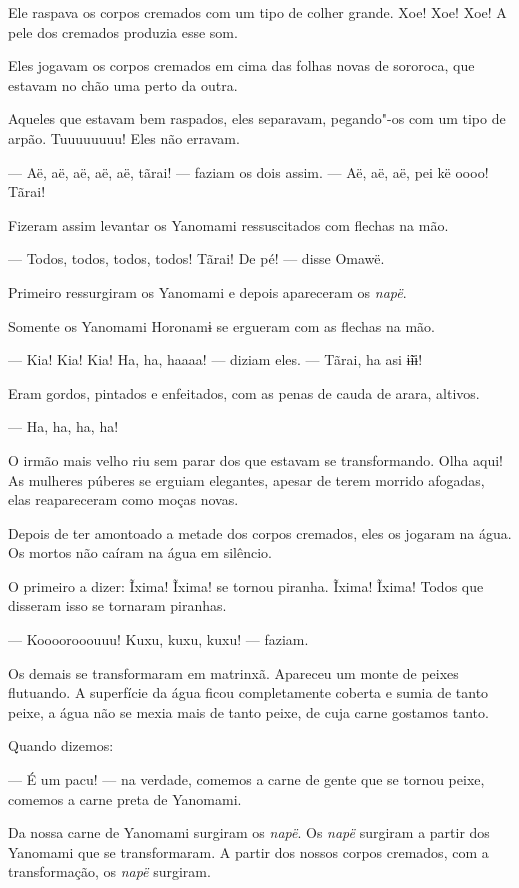 Ele raspava os corpos cremados com um tipo de colher grande. Xoe! Xoe!
Xoe! A pele dos cremados produzia esse som. 

Eles jogavam os corpos cremados em cima das folhas novas de sororoca,
que estavam no chão uma perto da outra. 

Aqueles que estavam bem raspados, eles separavam, pegando"-os com um
tipo de arpão. Tuuuuuuuu! Eles não erravam. 

--- Aë, aë, aë, aë, aë, tãrai! --- faziam os dois assim. --- Aë, aë, aë,
pei kë oooo! Tãrai! 

Fizeram assim levantar os Yanomami ressuscitados com flechas na mão. 

--- Todos, todos, todos, todos! Tãrai! De pé! --- disse Omawë.

Primeiro ressurgiram os Yanomami e depois apareceram os \emph{napë}. 

Somente os Yanomami Horonamɨ se ergueram com as flechas na mão. 

--- Kia! Kia! Kia! Ha, ha, haaaa! --- diziam eles. --- Tãrai, ha asi
ɨ̃ɨɨ! 

Eram gordos, pintados e enfeitados, com as penas de cauda de arara,
altivos.

--- Ha, ha, ha, ha! 

O irmão mais velho riu sem parar dos que estavam se transformando. Olha
aqui! As mulheres púberes se erguiam elegantes, apesar de terem morrido
afogadas, elas reapareceram como moças novas. 

Depois de ter amontoado a metade dos corpos cremados, eles os jogaram na
água. Os mortos não caíram na água em silêncio. 

O primeiro a dizer: Ĩxima! Ĩxima! se tornou piranha. Ĩxima! Ĩxima! Todos
que disseram isso se tornaram piranhas. 

--- Koooorooouuu! Kuxu, kuxu, kuxu! --- faziam. 

Os demais se transformaram em matrinxã. Apareceu um monte de peixes
flutuando. A superfície da água ficou completamente coberta e sumia de
tanto peixe, a água não se mexia mais de tanto peixe, de cuja carne gostamos
tanto.

Quando dizemos:

--- É um pacu! --- na verdade, comemos a carne de gente que se tornou
peixe, comemos a carne preta de Yanomami. 

Da nossa carne de Yanomami surgiram os \emph{napë}. Os \emph{napë} surgiram a partir dos Yanomami que se transformaram. A partir dos nossos corpos cremados, com a transformação, os \emph{napë} surgiram. 

